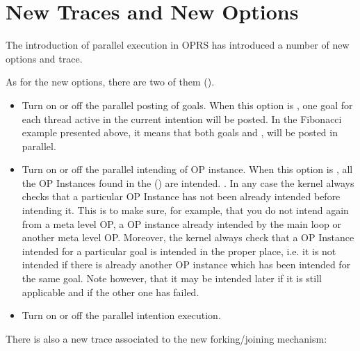 \section{New Traces and New Options}

The introduction of parallel execution in OPRS has introduced a number of new
options and trace.

As for the new options, there are two of them (). 

\begin{itemize}

\item {} Turn on or off the parallel posting of goals.
When this option is , one goal for each thread active in the current
intention will be posted. In the Fibonacci example presented above, it means
that both goals  and , will be posted in parallel.

\item {} Turn on or off the parallel intending of
OP instance. When this option is , all the OP Instances found in the
 () are intended.
. In any case the kernel always checks that a particular
OP Instance has not been already intended before intending it. This is to make
sure, for example, that you do not intend again from a meta level OP, a OP
instance already intended by the main loop or another meta level OP. Moreover,
the kernel always check that a OP Instance intended for a particular goal is
intended in the proper place, i.e. it is not intended if there is already
another OP instance which has been intended for the same goal. Note however,
that it may be intended later if it is still applicable and if the other one
has failed.

\item {} Turn on or off the parallel
intention execution.

\end{itemize}

There is also a new trace associated to the new forking/joining mechanism:

